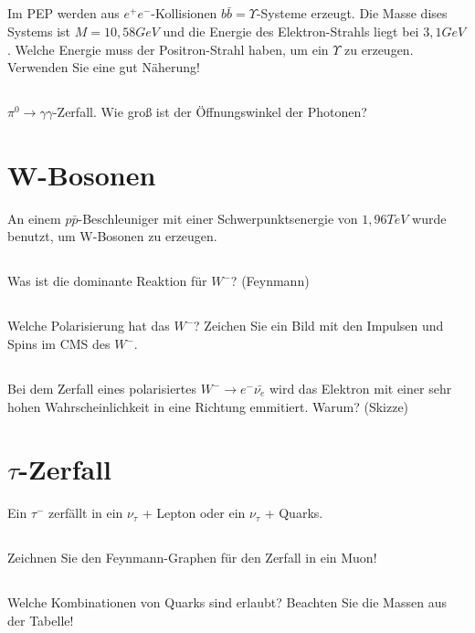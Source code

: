 \subsection{}  Im PEP werden aus $e^+ e^-$-Kollisionen $b\bar{b} = \Upsilon$-Systeme erzeugt. Die Masse dises Systems ist $M=10,58 GeV$ und die Energie des Elektron-Strahls liegt bei $3,1 GeV$. Welche Energie muss der Positron-Strahl haben, um ein $\Upsilon$ zu erzeugen. Verwenden Sie eine gut Näherung!
\subsection{} $\pi^0 \rightarrow \gamma \gamma $-Zerfall. Wie groß ist der Öffnungswinkel der Photonen?

\section{W-Bosonen} An einem $p\bar{p}$-Beschleuniger mit einer Schwerpunktsenergie von $1,96 TeV$ wurde benutzt, um W-Bosonen zu erzeugen.
\subsection{} Was ist die dominante Reaktion für $W^-$? (Feynmann)
\subsection{} Welche Polarisierung hat das $W^-$? Zeichen Sie ein Bild mit den Impulsen und Spins im CMS des $W^-$.
\subsection{} Bei dem Zerfall eines polarisiertes $W^- \rightarrow e^- \bar{\nu_e}$ wird das Elektron mit einer sehr hohen Wahrscheinlichkeit in eine Richtung emmitiert. Warum? (Skizze)

\section{$\tau$-Zerfall} Ein $\tau^-$ zerfällt in ein $\nu_{\tau}$ + Lepton oder ein $\nu_{\tau}$ + Quarks.
\subsection{} Zeichnen Sie den Feynmann-Graphen für den Zerfall in ein Muon!
\subsection{} Welche Kombinationen von Quarks sind erlaubt? Beachten Sie die Massen aus der Tabelle!
